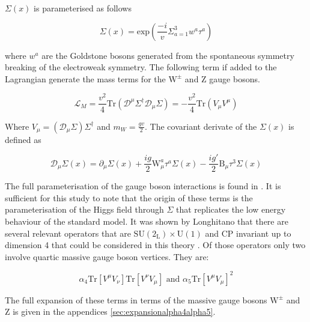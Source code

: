 $\Sigma(x)$ is parameterised as follows

\begin{equation}
\Sigma(x) = \text{exp} (\frac{-i}{v} \Sigma^{3}_{a=1} w^{a}\tau^{a})
\end{equation}

where $w^{a}$ are the Goldstone bosons generated from the spontaneous symmetry breaking of the electroweak symmetry.  The following term if added to the Lagrangian generate the mass terms for the $\text{W}^{\pm}$ and Z gauge bosons.

\begin{equation}
\mathcal{L}_{M} = \frac{v^{2}}{4} \text{Tr} (\mathcal{D}^{\mu} \Sigma^{\dagger} \mathcal{D}_{\mu} \Sigma) = -\frac{v^{2}}{4}\text{Tr}(V_{\mu} V^{\mu})
\end{equation}

Where $V_{\mu} = (\mathcal{D}_{\mu}\Sigma) \Sigma^{\dagger}$ and $m_{W} = \frac{gv}{2}$.  The covariant derivate of the $\Sigma(x)$ is defined as

\begin{equation}
\mathcal{D}_{\mu} \Sigma(x) = \partial_{\mu} \Sigma(x) + \frac{ig}{2}\text{W}_{\mu}^{a}\tau^{a}\Sigma(x) - \frac{ig'}{2}\text{B}_{\mu}\tau^{3}\Sigma(x)
\end{equation}

The full parameterisation of the gauge boson interactions is found in \cite{Herrero:1994tj}.  It is sufficient for this study to note that the origin of these terms is the parameterisation of the Higgs field through $\Sigma$ that replicates the low energy behaviour of the standard model.  It was shown by Longhitano that there are several relevant operators that are $\text{SU}(2_{\text{L}}) \times \text{U}(1)$ and CP invariant up to dimension 4 that could be considered in this theory \cite{Longhitano:1980tm}.  Of those operators only two involve quartic massive gauge boson vertices.  They are:

\begin{equation}
\alpha_{4}\text{Tr}[V^{\mu}V_{\nu}]\text{Tr}[V^{\nu}V_{\mu}] \text{ and } \alpha_{5}\text{Tr}[V^{\mu}V_{\mu}]^{2}
\end{equation}

The full expansion of these terms in terms of the massive gauge bosons $\text{W}^{\pm}$ and Z is given in the appendices \ref{sec:expansionalpha4alpha5}.   

